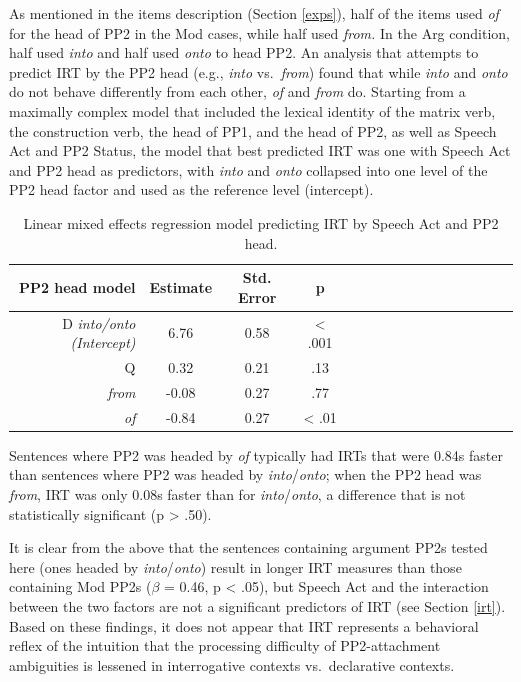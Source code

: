 \documentclass[11pt,oneside]{book}
\begin{document}
As mentioned in the items description (Section \ref{exps}), half of the items used \emph{of} for the head of PP2 in the Mod cases, while half used \emph{from.} In the Arg condition, half used \emph{into} and half used \emph{onto} to head PP2. An analysis that attempts to predict IRT by the PP2 head (e.g., \emph{into} vs.~\emph{from}) found that while \emph{into} and \emph{onto} do not behave differently from each other, \emph{of} and \emph{from} do. Starting from a maximally complex model that included the lexical identity of the matrix verb, the construction verb, the head of PP1, and the head of PP2, as well as Speech Act and PP2 Status, the model that best predicted IRT was one with Speech Act and PP2 head as predictors, with \emph{into} and \emph{onto} collapsed into one level of the PP2 head factor and used as the reference level (intercept).

\begin{table}[!h]

\caption{\label{tab:pp2hd}Linear mixed effects regression model predicting IRT by Speech Act and PP2 head.}
\centering
\begin{tabular}{rcccrcccrcccrccc}
\toprule
PP2 head model & Estimate & Std. Error & p\\
\midrule
D \em{into/onto} (Intercept) & 6.76 & 0.58 & < .001\\
Q & 0.32 & 0.21 & .13\\
\em{from} & -0.08 & 0.27 & .77\\
\em{of} & -0.84 & 0.27 & < .01\\
\bottomrule
\end{tabular}
\end{table}

Sentences where PP2 was headed by \emph{of} typically had IRTs that were 0.84s faster than sentences where PP2 was headed by \emph{into}/\emph{onto}; when the PP2 head was \emph{from}, IRT was only 0.08s faster than for \emph{into}/\emph{onto}, a difference that is not statistically significant (p \textgreater{} .50).

It is clear from the above that the sentences containing argument PP2s tested here (ones headed by \emph{into}/\emph{onto}) result in longer IRT measures than those containing Mod PP2s (\(\beta\) = 0.46, p \textless{} .05), but Speech Act and the interaction between the two factors are not a significant predictors of IRT (see Section \ref{irt}). Based on these findings, it does not appear that IRT represents a behavioral reflex of the intuition that the processing difficulty of PP2-attachment ambiguities is lessened in interrogative contexts vs.~declarative contexts.
\end{document}
